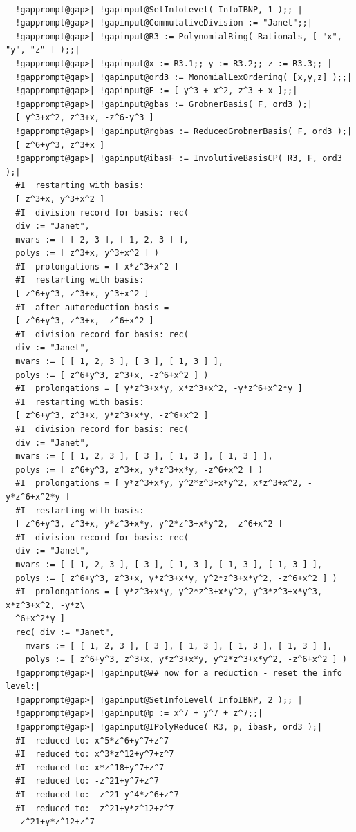 \documentclass[a4paper,11pt]{report}
\begin{document}
{{{\begin{Verbatim}[commandchars=!@|,fontsize=\small,frame=single,label=Example]
  
  !gapprompt@gap>| !gapinput@SetInfoLevel( InfoIBNP, 1 );; |
  !gapprompt@gap>| !gapinput@CommutativeDivision := "Janet";;|
  !gapprompt@gap>| !gapinput@R3 := PolynomialRing( Rationals, [ "x", "y", "z" ] );;|
  !gapprompt@gap>| !gapinput@x := R3.1;; y := R3.2;; z := R3.3;; |
  !gapprompt@gap>| !gapinput@ord3 := MonomialLexOrdering( [x,y,z] );;|
  !gapprompt@gap>| !gapinput@F := [ y^3 + x^2, z^3 + x ];;|
  !gapprompt@gap>| !gapinput@gbas := GrobnerBasis( F, ord3 );|
  [ y^3+x^2, z^3+x, -z^6-y^3 ]
  !gapprompt@gap>| !gapinput@rgbas := ReducedGrobnerBasis( F, ord3 );|
  [ z^6+y^3, z^3+x ]
  !gapprompt@gap>| !gapinput@ibasF := InvolutiveBasisCP( R3, F, ord3 );|
  #I  restarting with basis:
  [ z^3+x, y^3+x^2 ]
  #I  division record for basis: rec(
  div := "Janet",
  mvars := [ [ 2, 3 ], [ 1, 2, 3 ] ],
  polys := [ z^3+x, y^3+x^2 ] )
  #I  prolongations = [ x*z^3+x^2 ]
  #I  restarting with basis:
  [ z^6+y^3, z^3+x, y^3+x^2 ]
  #I  after autoreduction basis = 
  [ z^6+y^3, z^3+x, -z^6+x^2 ]
  #I  division record for basis: rec(
  div := "Janet",
  mvars := [ [ 1, 2, 3 ], [ 3 ], [ 1, 3 ] ],
  polys := [ z^6+y^3, z^3+x, -z^6+x^2 ] )
  #I  prolongations = [ y*z^3+x*y, x*z^3+x^2, -y*z^6+x^2*y ]
  #I  restarting with basis:
  [ z^6+y^3, z^3+x, y*z^3+x*y, -z^6+x^2 ]
  #I  division record for basis: rec(
  div := "Janet",
  mvars := [ [ 1, 2, 3 ], [ 3 ], [ 1, 3 ], [ 1, 3 ] ],
  polys := [ z^6+y^3, z^3+x, y*z^3+x*y, -z^6+x^2 ] )
  #I  prolongations = [ y*z^3+x*y, y^2*z^3+x*y^2, x*z^3+x^2, -y*z^6+x^2*y ]
  #I  restarting with basis:
  [ z^6+y^3, z^3+x, y*z^3+x*y, y^2*z^3+x*y^2, -z^6+x^2 ]
  #I  division record for basis: rec(
  div := "Janet",
  mvars := [ [ 1, 2, 3 ], [ 3 ], [ 1, 3 ], [ 1, 3 ], [ 1, 3 ] ],
  polys := [ z^6+y^3, z^3+x, y*z^3+x*y, y^2*z^3+x*y^2, -z^6+x^2 ] )
  #I  prolongations = [ y*z^3+x*y, y^2*z^3+x*y^2, y^3*z^3+x*y^3, x*z^3+x^2, -y*z\
  ^6+x^2*y ]
  rec( div := "Janet", 
    mvars := [ [ 1, 2, 3 ], [ 3 ], [ 1, 3 ], [ 1, 3 ], [ 1, 3 ] ], 
    polys := [ z^6+y^3, z^3+x, y*z^3+x*y, y^2*z^3+x*y^2, -z^6+x^2 ] )
  !gapprompt@gap>| !gapinput@## now for a reduction - reset the info level:|
  !gapprompt@gap>| !gapinput@SetInfoLevel( InfoIBNP, 2 );; |
  !gapprompt@gap>| !gapinput@p := x^7 + y^7 + z^7;;|
  !gapprompt@gap>| !gapinput@IPolyReduce( R3, p, ibasF, ord3 );|
  #I  reduced to: x^5*z^6+y^7+z^7
  #I  reduced to: x^3*z^12+y^7+z^7
  #I  reduced to: x*z^18+y^7+z^7
  #I  reduced to: -z^21+y^7+z^7
  #I  reduced to: -z^21-y^4*z^6+z^7
  #I  reduced to: -z^21+y*z^12+z^7
  -z^21+y*z^12+z^7
  

\end{Verbatim}}}}
\end{document}
